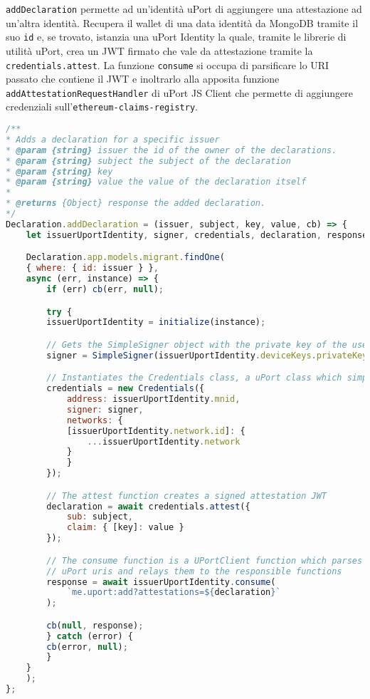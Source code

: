 \texttt{addDeclaration} permette ad un'identità uPort di aggiungere una attestazione
ad un'altra identità. 
Recupera il wallet di
una data identità da MongoDB tramite il suo \texttt{id}
e, se trovato, istanzia una uPort Identity la quale, tramite le librerie di utilità uPort,
crea un JWT firmato che vale da attestazione tramite la \texttt{credentials.attest}.
La funzione \texttt{consume} si occupa di parsificare lo URI passato che contiene il JWT
e inoltrarlo alla apposita funzione \texttt{addAttestationRequestHandler} di uPort JS Client
che permette di aggiungere credenziali sull'\texttt{ethereum-claims-registry}.

\begin{lstlisting}[language=JavaScript, numbers=none]
/**
* Adds a declaration for a specific issuer
* @param {string} issuer the id of the owner of the declarations.
* @param {string} subject the subject of the declaration
* @param {string} key
* @param {string} value the value of the declaration itself
*
* @returns {Object} response the added declaration.
*/
Declaration.addDeclaration = (issuer, subject, key, value, cb) => {
    let issuerUportIdentity, signer, credentials, declaration, response;

    Declaration.app.models.migrant.findOne(
    { where: { id: issuer } },
    async (err, instance) => {
        if (err) cb(err, null);

        try {
        issuerUportIdentity = initialize(instance);

        // Gets the SimpleSigner object with the private key of the user, which is needed to sign transactions
        signer = SimpleSigner(issuerUportIdentity.deviceKeys.privateKey);

        // Instantiates the Credentials class, a uPort class which simplifies the creation of signed attestation JWTs
        credentials = new Credentials({
            address: issuerUportIdentity.mnid,
            signer: signer,
            networks: {
            [issuerUportIdentity.network.id]: {
                ...issuerUportIdentity.network
            }
            }
        });

        // The attest function creates a signed attestation JWT
        declaration = await credentials.attest({
            sub: subject,
            claim: { [key]: value }
        });

        // The consume function is a UPortClient function which parses
        // uPort uris and relays them to the responsible functions
        response = await issuerUportIdentity.consume(
            `me.uport:add?attestations=${declaration}`
        );

        cb(null, response);
        } catch (error) {
        cb(error, null);
        }
    }
    );
};
\end{lstlisting}

